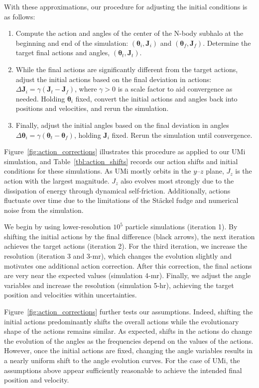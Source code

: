 \documentclass[times,trackchanges, twocolumn, twocolappendix]{aastex701}
\begin{document}
With these approximations, our procedure for adjusting the initial conditions is as follows:
\begin{enumerate}
    \item Compute the action and angles of the center of the N-body subhalo at the beginning and end of the simulation: $(\bm \theta_i, \mathbf J_i)$ and $(\bm \theta_f, \mathbf J_f)$. Determine the target final actions and angles, $(\bm \theta_t, \mathbf J_t)$. 
    \item While the final actions are significantly different from the target actions, adjust the initial actions based on the final deviation in actions: $\Delta \mathbf J_i = \gamma(\mathbf J_t - \mathbf J_f)$, where $\gamma > 0$ is a scale factor to aid convergence as needed. Holding $\bm \theta_i$ fixed, convert the initial actions and angles back into positions and velocities, and rerun the simulation.
    \item Finally, adjust the initial angles based on the final deviation in angles $\Delta \bm \theta_i = \gamma(\bm \theta_t - \bm \theta_f)$, holding $\mathbf J_i$ fixed. Rerun the simulation until convergence. 
\end{enumerate}




Figure~\ref{fig:action_corrections} illustrates this procedure as applied to our UMi simulation, and Table~\ref{tbl:action_shifts} records our action shifts and initial conditions for these simulations. As UMi mostly orbits in the $y$--$z$ plane, $J_z$ is the action with the largest magnitude. $J_z$ also evolves most strongly due to the dissipation of energy through dynamical self-friction. Additionally, actions fluctuate over time due to the limitations of the St\"ackel fudge and numerical noise from the simulation. 

We begin by using lower-resolution $10^5$ particle simulations (iteration 1). By shifting the initial actions by the final difference (black arrows), the next iteration achieves the target actions (iteration 2). For the third iteration, we increase the resolution (iteration 3 and 3-mr), which changes the evolution slightly and motivates one additional action correction.  
After this correction, the final actions are very near the expected values (simulation 4-mr). Finally, we adjust the angle variables and increase the resolution (simulation 5-hr), achieving the target position and velocities within uncertainties. 

Figure~\ref{fig:action_corrections} further tests our assumptions. Indeed, shifting the initial actions predominantly shifts the overall actions while the evolutionary shape of the actions remains similar.  As expected, shifts in the actions do change the evolution of the angles as the frequencies depend on the values of the actions. However, once the initial actions are fixed, changing the angle variables results in a nearly uniform shift to the angle evolution curves. For the case of UMi, the assumptions above appear sufficiently reasonable to achieve the intended final position and velocity.
\end{document}
